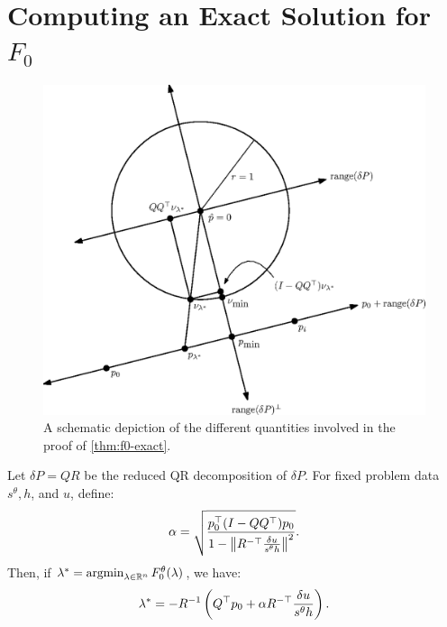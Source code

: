 \documentclass[eikonal.tex]{subfiles}
\begin{document}
\section{Computing an Exact Solution for $F_0$}

\begin{figure}
  \centering
  \includegraphics[width=0.65\linewidth]{f0-exact.eps}
  \caption{A schematic depiction of the different quantities involved
    in the proof of \cref{thm:f0-exact}.}\label{fig:f0-exact}
\end{figure}

\begin{theorem}\label{thm:f0-exact}
  Let $\delta P = QR$ be the reduced QR decomposition of $\delta
  P$. For fixed problem data $s^\theta, h$, and $u$, define:
  \begin{equation}
    \alpha = \sqrt{\frac{p_0^\top {(I - QQ^\top)} p_0}{1 - \left\|R^{-\top} \frac{\delta u}{s^\theta h}\right\|^2}}.
  \end{equation}
  Then, if
  $\lambda^* = \operatorname{argmin}_{\lambda \in \mathbb{R}^n}
  F_0^\theta(\lambda)$, we have:
  \begin{equation}\label{eq:f0-exact-lambda}
    \lambda^* = -R^{-1} \left(Q^\top p_0 + \alpha R^{-\top} \frac{\delta u}{s^\theta h}\right).
  \end{equation}
\end{theorem}
\end{document}
